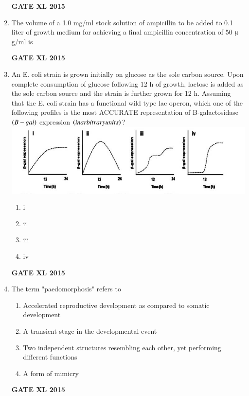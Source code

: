 \documentclass[journal,12pt,onecolumn]{IEEEtran}
\begin{document}
\begin{enumerate}
\begin{flushright}\textbf{GATE XL 2015}\end{flushright}
\item  The volume  of a 1.0 mg/ml stock solution of ampicillin to be added to 0.1 liter of growth medium for achieving a final ampicillin concentration of 50 $\micro$g/ml is
\begin{flushright}\textbf{GATE XL 2015}\end{flushright}
\item An E. coli strain is grown initially on glucose as the sole carbon source. Upon complete consumption of glucose following 12 h of growth, lactose is added as the sole carbon source and the strain is further grown for 12 h. Assuming that the E. coli strain has a functional wild type lac operon, which one of the following profiles is the most ACCURATE representation of B-galactosidase $\left(B-gal\right)$ expression $\left(in arbitrary units\right)$?
	\includegraphics[width=15cm]{85}
    \begin{enumerate}
            \item i
	    \item ii
	    \item iii
            \item iv
    \end{enumerate}
\begin{flushright}\textbf{GATE XL 2015}\end{flushright}
\item  The term "paedomorphosis" refers to
    \begin{enumerate}
            \item Accelerated reproductive development as compared to somatic development
	    \item A transient stage in the developmental event
	    \item  Two independent structures resembling each other, yet performing different functions
            \item A form of mimicry
    \end{enumerate}
\begin{flushright}\textbf{GATE XL 2015}\end{flushright}

\end{enumerate}
\end{document}
